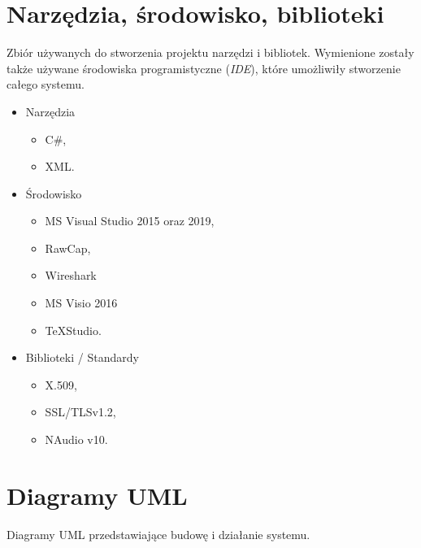 \documentclass[12pt,a4paper]{article}
\begin{document}
	\section{Narzędzia, środowisko, biblioteki}
	\par Zbiór używanych do stworzenia projektu narzędzi i bibliotek. Wymienione zostały także używane środowiska programistyczne (\textit{IDE}), które umożliwiły stworzenie całego systemu. 
	\begin{itemize}
		\item Narzędzia
		\begin{itemize}
			\item C\#,
			\item XML.		
		\end{itemize}
	
		\item Środowisko
		\begin{itemize}
			\item MS Visual Studio 2015 oraz 2019,
			\item RawCap,
			\item Wireshark
			\item MS Visio 2016 
			\item TeXStudio.
		\end{itemize}
	
		\item Biblioteki / Standardy
		\begin{itemize}
			\item X.509,
			\item SSL/TLSv1.2,
			\item NAudio v10.
		\end{itemize}
	\end{itemize}
	
	\newpage
	\section{Diagramy UML}
	
	Diagramy UML przedstawiające budowę i działanie systemu.
\end{document}
